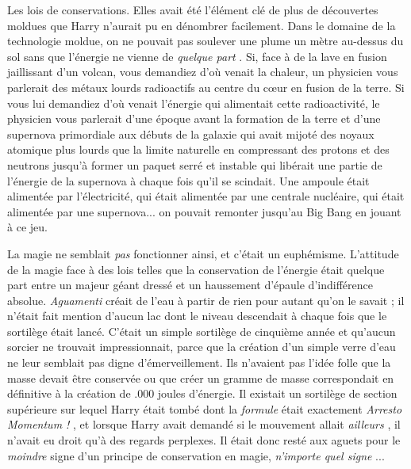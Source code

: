 Les lois de conservations. Elles avait été l'élément clé de plus de découvertes moldues que Harry n'aurait pu en dénombrer facilement. Dans le domaine de la technologie moldue, on ne pouvait pas soulever une plume un mètre au-dessus du sol sans que l'énergie ne vienne de \emph{quelque part} . Si, face à de la lave en fusion jaillissant d'un volcan, vous demandiez d'où venait la chaleur, un physicien vous parlerait des métaux lourds radioactifs au centre du cœur en fusion de la terre. Si vous lui demandiez d'où venait l'énergie qui alimentait cette radioactivité, le physicien vous parlerait d'une époque avant la formation de la terre et d'une supernova primordiale aux débuts de la galaxie qui avait mijoté des noyaux atomique plus lourds que la limite naturelle en compressant des protons et des neutrons jusqu'à former un paquet serré et instable qui libérait une partie de l'énergie de la supernova à chaque fois qu'il se scindait. Une ampoule était alimentée par l'électricité, qui était alimentée par une centrale nucléaire, qui était alimentée par une supernova... on pouvait remonter jusqu'au Big Bang en jouant à ce jeu.

La magie ne semblait \emph{pas}  fonctionner ainsi, et c'était un euphémisme. L'attitude de la magie face à des lois telles que la conservation de l'énergie était quelque part entre un majeur géant dressé et un haussement d'épaule d'indifférence absolue. \emph{Aguamenti}  créait de l'eau à partir de rien pour autant qu'on le savait ; il n'était fait mention d'aucun lac dont le niveau descendait à chaque fois que le sortilège était lancé. C'était un simple sortilège de cinquième année et qu'aucun sorcier ne trouvait impressionnait, parce que la création d'un simple verre d'eau ne leur semblait pas digne d'émerveillement. Ils n'avaient pas l'idée folle que la masse devait être conservée ou que créer un gramme de masse correspondait en définitive à la création de .000 joules d'énergie. Il existait un sortilège de section supérieure sur lequel Harry était tombé dont la \emph{formule } était exactement \emph{Arresto Momentum !} , et lorsque Harry avait demandé si le mouvement allait \emph{ailleurs} , il n'avait eu droit qu'à des regards perplexes. Il était donc resté aux aguets pour le \emph{moindre}  signe d'un principe de conservation en magie, \emph{n'importe quel signe} ...

